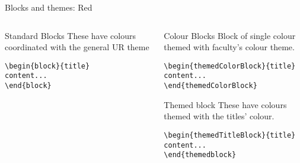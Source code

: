 \begingroup
{}
\begin{frame}[fragile]{Blocks and themes: Red}
\begin{columns} %
\begin{column}{0.3\textwidth}
\begin{block}{Standard Blocks}
These have colours coordinated with the general UR theme
\begin{verbatim}
\begin{block}{title}
content...
\end{block}
\end{verbatim}
\end{block}
\end{column}
\begin{column}{0.7\textwidth}
\begin{themedColorBlock}{Colour Blocks}
Block of single colour themed with faculty's colour theme.
\small
\begin{verbatim}
\begin{themedColorBlock}{title}
content...
\end{themedColorBlock}
\end{verbatim}
\end{themedColorBlock}
\begin{themedTitleBlock} {Themed block}
These have colours themed with the titles' colour.
\small
\begin{verbatim}
\begin{themedTitleBlock}{title}
content...
\end{themedblock}
\end{verbatim}
\end{themedTitleBlock}
\end{column}
\end{columns}
\end{frame}
\endgroup


